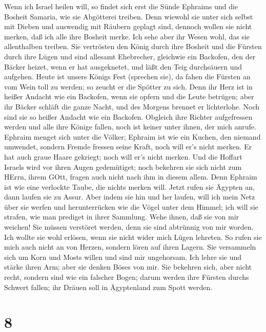  Wenn ich Israel heilen will, so findet sich erst die Sünde
Ephraims und die Bosheit Samaria, wie sie Abgötterei treiben. Denn
wiewohl sie unter sich selbst mit Dieben und auswendig mit Räubern
geplagt sind,  dennoch wollen sie nicht merken, daß ich alle
ihre Bosheit merke. Ich sehe aber ihr Wesen wohl, das sie allenthalben
treiben.  Sie vertrösten den König durch ihre Bosheit und
die Fürsten durch ihre Lügen  und sind allesamt Ehebrecher,
gleichwie ein Backofen, den der Bäcker heizet, wenn er hat ausgeknetet,
und läßt den Teig durchsäuern und aufgehen.  Heute ist
unsers Königs Fest (sprechen sie), da fahen die Fürsten an vom Wein toll
zu werden; so zeucht er die Spötter zu sich.  Denn ihr Herz
ist in heißer Andacht wie ein Backofen, wenn sie opfern und die Leute
betrügen; aber ihr Bäcker schläft die ganze Nacht, und des Morgens
brennet er lichterlohe.  Noch sind sie so heißer Andacht wie
ein Backofen. Obgleich ihre Richter aufgefressen werden und alle ihre
Könige fallen, noch ist keiner unter ihnen, der mich anrufe.
 Ephraim menget sich unter die Völker; Ephraim ist wie ein
Kuchen, den niemand umwendet,  sondern Fremde fressen seine
Kraft, noch will er's nicht merken. Er hat auch graue Haare gekriegt;
noch will er's nicht merken.  Und die Hoffart Israels wird
vor ihren Augen gedemütiget; noch bekehren sie sich nicht zum HErrn,
ihrem GOtt, fragen auch nicht nach ihm in diesem allem. 
Denn Ephraim ist wie eine verlockte Taube, die nichts merken will. Jetzt
rufen sie Ägypten an, dann laufen sie zu Assur.  Aber indem
sie hin und her laufen, will ich mein Netz über sie werfen und
herunterrücken wie die Vögel unter dem Himmel; ich will sie strafen, wie
man prediget in ihrer Sammlung.  Wehe ihnen, daß sie von
mir weichen! Sie müssen verstöret werden, denn sie sind abtrünnig von
mir worden. Ich wollte sie wohl erlösen, wenn sie nicht wider mich Lügen
lehreten.  So rufen sie mich auch nicht an von Herzen,
sondern lören auf ihren Lagern. Sie versammeln sich um Korn und Mosts
willen und sind mir ungehorsam.  Ich lehre sie und stärke
ihren Arm; aber sie denken Böses von mir.  Sie bekehren
sich, aber nicht recht, sondern sind wie ein falscher Bogen; darum
werden ihre Fürsten durchs Schwert fallen; ihr Dräuen soll in
Ägyptenland zum Spott werden.

\hypertarget{section-7}{%
\section{8}\label{section-7}}

